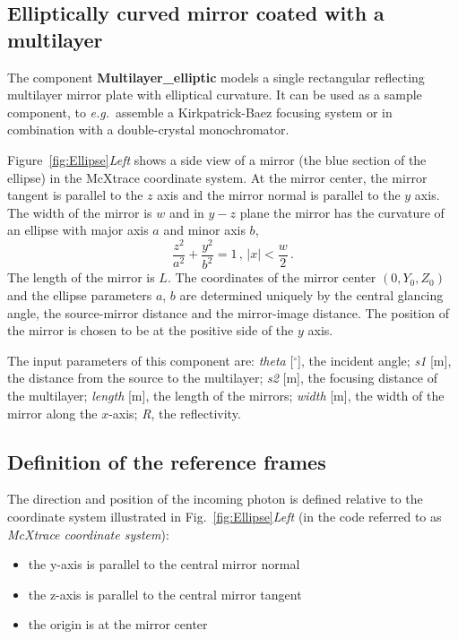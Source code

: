 \subsection*{Elliptically curved mirror coated with a multilayer}
\label{s:mirror}


The component \textbf{Multilayer\_elliptic}
models a single rectangular reflecting multilayer mirror plate with elliptical curvature. It can be used
as a sample component, to \textit{e.g.}~assemble a Kirkpatrick-Baez focusing system 
or in combination with a double-crystal monochromator.


Figure~\ref{fig:Ellipse}\emph{Left} shows a side view of a mirror
(the blue section of the ellipse) in the McXtrace coordinate system.
At the mirror center, the mirror tangent is parallel to the $z$ axis
and the mirror normal is parallel to the $y$ axis. The width of the
mirror is $w$ and in $y-z$ plane the mirror has the curvature of an
ellipse with major axis $a$ and minor axis $b$,
%
\begin{equation} 
\frac{z^2}{ a^2} + \frac{y^2}{b^2} =1\,, \,|x| <
\frac{w}{2}\,.
\end{equation}
%
The length of the mirror is $L$. The coordinates of the mirror
center $(0,Y_0,Z_0)$ and the ellipse parameters $a$, $b$ are
determined uniquely by the central glancing angle, the source-mirror
distance and the mirror-image distance. The position of the mirror
is chosen to be at the positive side of the $y$ axis.

The input parameters of this component are:
\textit{theta} [$^{\circ}$], the incident angle; 
\textit{s1} [m], the distance from the source to the multilayer;
\textit{s2} [m], the focusing distance of the multilayer;
\textit{length} [m], the length of the mirrors;
\textit{width} [m], the width of the mirror along the $x$-axis;
\textit{R}, the reflectivity.

\subsection{Definition of the reference frames}
The direction and position of the incoming photon is defined
relative to the coordinate system illustrated in
Fig.~\ref{fig:Ellipse}\emph{Left} (in the code referred to as
\emph{McXtrace coordinate system}):
\begin{itemize}
\item the y-axis is parallel to the central mirror normal
\item the z-axis is parallel to the central mirror tangent
\item the origin is at the mirror center
\end{itemize}


